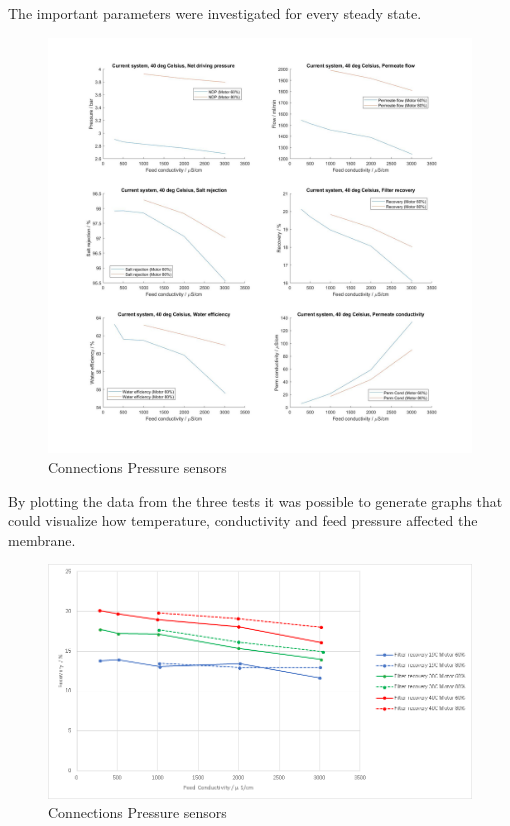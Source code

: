 \newpage

The important parameters were investigated for every steady state.
\begin{figure}[H]
    \centering
    \includegraphics[width=1.1\textwidth]{Key40}
    \caption{Connections Pressure sensors}
    \label{fig:PressConn}
\end{figure}

By plotting the data from the three tests it was possible to generate graphs that could visualize how temperature, conductivity and feed pressure affected the membrane.

\begin{figure}[H]
    \centering
    \includegraphics[width=1.1\textwidth]{Recovery}
    \caption{Connections Pressure sensors}
    \label{fig:PressConn}
\end{figure}

